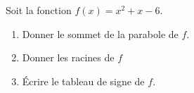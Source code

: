 
\begin{exercice}\label{exosmath-0288}

    Soit la fonction \( f(x)=x^2+x-6\).
    \begin{enumerate}
        \item
            Donner le sommet de la parabole de $f$.
        \item
            Donner les racines de \( f\)
        \item
            Écrire le tableau de signe de \( f\).
    \end{enumerate}

\end{exercice}
